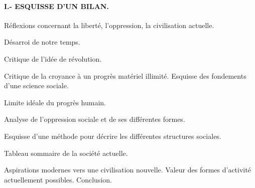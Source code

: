 \documentclass[french,twoside]{book} %
\begin{document}
\paragraph[I.- ESQUISSE D'UN BILAN.]{I.- ESQUISSE D'UN BILAN.}

\begin{center}
Réflexions concernant la liberté, l'oppression, la civilisation actuelle.\end{center}
\noindent Désarroi de notre temps.\par
Critique de l'idée de révolution.\par
Critique de la croyance à un progrès matériel illimité. Esquisse des fondements d'une science sociale.\par
Limite idéale du progrès humain.\par
Analyse de l'oppression sociale et de ses différentes formes.\par
Esquisse d'une méthode pour décrire les différentes structures sociales.\par
Tableau sommaire de la société actuelle.\par
Aspirations modernes vers une civilisation nouvelle. Valeur des formes d'activité actuellement possibles. Conclusion.
\end{document}
